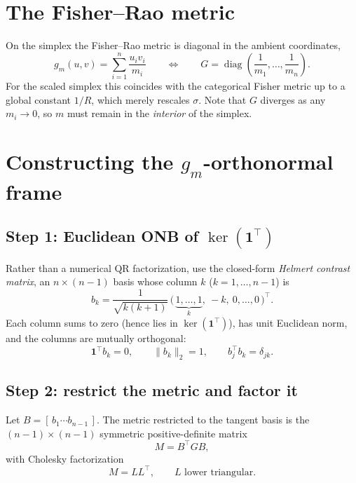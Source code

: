 \documentclass[11pt]{article}
\newcommand{\one}{\mathbf{1}}
\DeclareMathOperator{\diag}{diag}
\begin{document}
\section{The Fisher--Rao metric}

On the simplex the Fisher--Rao metric is diagonal in the ambient coordinates,
\begin{equation}
  g_m(u, v) = \sum_{i=1}^{n} \frac{u_i v_i}{m_i}
  \qquad\Longleftrightarrow\qquad
  G = \diag\!\left(\frac{1}{m_1}, \dots, \frac{1}{m_n}\right).
  \label{eq:metric}
\end{equation}
For the scaled simplex this coincides with the categorical Fisher metric up to
a global constant $1/R$, which merely rescales $\sigma$. Note that $G$ diverges
as any $m_i \to 0$, so $m$ must remain in the \emph{interior} of the simplex.

\section{Constructing the $g_m$-orthonormal frame}

\subsection*{Step 1: Euclidean ONB of $\ker(\one^\top)$}

Rather than a numerical QR factorization, use the closed-form \emph{Helmert
contrast matrix}, an $n \times (n-1)$ basis whose column $k$
($k = 1, \dots, n-1$) is
\begin{equation}
  b_k = \frac{1}{\sqrt{k(k+1)}}\,
        \bigl(\,\underbrace{1, \dots, 1}_{k},\ -k,\ 0, \dots, 0\,\bigr)^\top.
  \label{eq:helmert}
\end{equation}
Each column sums to zero (hence lies in $\ker(\one^\top)$), has unit Euclidean
norm, and the columns are mutually orthogonal:
\begin{equation}
  \one^\top b_k = 0, \qquad \|b_k\|_2 = 1, \qquad b_j^\top b_k = \delta_{jk}.
\end{equation}

\subsection*{Step 2: restrict the metric and factor it}

Let $B = [\,b_1 \cdots b_{n-1}\,]$. The metric restricted to the tangent basis
is the $(n-1)\times(n-1)$ symmetric positive-definite matrix
\begin{equation}
  M = B^\top G B,
\end{equation}
with Cholesky factorization
\begin{equation}
  M = L L^\top, \qquad L \text{ lower triangular.}
\end{equation}
\end{document}
